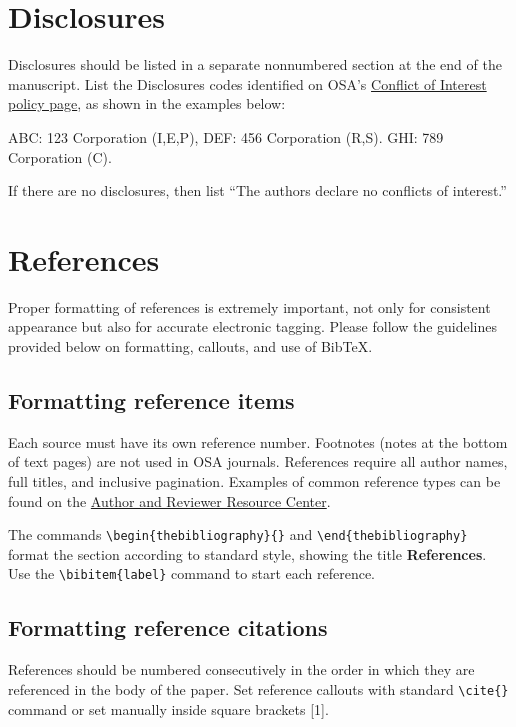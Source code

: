 \documentclass{osa-article}
\begin{document}
\section*{Disclosures}

Disclosures should be listed in a separate nonnumbered section at the end of the manuscript. List the Disclosures codes identified on OSA's \href{http://www.osapublishing.org/submit/review/conflicts-interest-policy.cfm}{Conflict of Interest policy page}, as shown in the examples below:

\medskip

\noindent ABC: 123 Corporation (I,E,P), DEF: 456 Corporation (R,S). GHI: 789 Corporation (C).

\medskip

\noindent If there are no disclosures, then list ``The authors declare no conflicts of interest.''


\section{References}
\label{sec:refs}
Proper formatting of references is extremely important, not only for consistent appearance but also for accurate electronic tagging. Please follow the guidelines provided below on formatting, callouts, and use of Bib\TeX.

\subsection{Formatting reference items}
Each source must have its own reference number. Footnotes (notes at the bottom of text pages) are not used in OSA journals. References require all author names, full titles, and inclusive pagination. Examples of common reference types can be found on the  \href{http://www.osapublishing.org/submit/style/style_traditional_journals.cfm} {Author and Reviewer Resource Center}.


The commands \verb+\begin{thebibliography}{}+ and \verb+\end{thebibliography}+ format the section according to standard style, showing the title {\bfseries References}.  Use the \verb+\bibitem{label}+ command to start each reference.

\subsection{Formatting reference citations}
References should be numbered consecutively in the order in which they are referenced in the body of the paper. Set reference callouts with standard \verb+\cite{}+ command or set manually inside square brackets [1].
\end{document}

